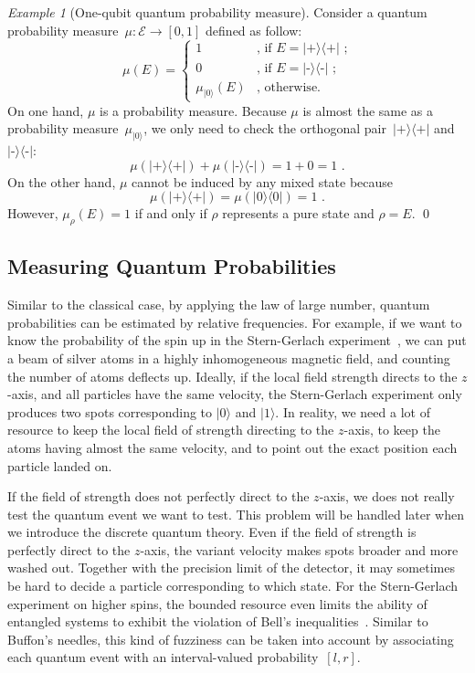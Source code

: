 \documentclass{article}
\theoremstyle{remark}
\newtheorem{example}{Example}
\newcommand{\events}{\ensuremath{\mathcal{E}}}
\newcommand{\ket}[1]{|#1\rangle}
\newcommand{\proj}[1]{|#1 \rangle\langle #1 |}
\newcommand{\ps}{\texttt{+}}
\newcommand{\ms}{\texttt{-}}
\begin{document}
\begin{example}[One-qubit quantum probability measure] Consider
a quantum probability measure~$\mu:\events\rightarrow[0,1]$ defined
as follow: 
\[
\mu(E)=\begin{cases}
1 & \textrm{, if }E=\proj{\ps}\textrm{ ;}\\
0 & \textrm{, if }E=\proj{\ms}\textrm{ ;}\\
\mu_{\ket{0}}(E) & \textrm{, otherwise.}
\end{cases}
\]
On one hand, $\mu$ is a probability measure. Because $\mu$ is almost
the same as a probability measure~$\mu_{\ket{0}}$, we only need
to check the orthogonal pair~$\proj{\ps}$ and $\proj{\ms}$: 
\[
\mu(\proj{\ps})+\mu(\proj{\ms})=1+0=1\textrm{ .}
\]
On the other hand, $\mu$ cannot be induced by any mixed state because
\[
\mu(\proj{\ps})=\mu(\proj{0})=1\textrm{ .}
\]
However, $\mu_{\rho}(E)=1$ if and only if $\rho$ represents a pure
state and $\rho=E$. \qed\end{example}

\subsection{Measuring Quantum Probabilities}

Similar to the classical case, by applying the law of large number,
quantum probabilities can be estimated by relative frequencies. For
example, if we want to know the probability of the spin up in the
Stern-Gerlach experiment~\cite{Stern1988,peres1995quantum,544199,Griffiths2003},
we can put a beam of silver atoms in a highly inhomogeneous magnetic
field, and counting the number of atoms deflects up. Ideally, if the
local field strength directs to the $z$-axis, and all particles have
the same velocity, the Stern-Gerlach experiment only produces two
spots corresponding to $\ket{0}$ and $\ket{1}$. In reality, we need
a lot of resource to keep the local field of strength directing to
the $z$-axis, to keep the atoms having almost the same velocity,
and to point out the exact position each particle landed on. 

If the field of strength does not perfectly direct to the $z$-axis,
we does not really test the quantum event we want to test. This problem
will be handled later when we introduce the discrete quantum theory.
Even if the field of strength is perfectly direct to the $z$-axis,
the variant velocity makes spots broader and more washed out. Together
with the precision limit of the detector, it may sometimes be hard
to decide a particle corresponding to which state. For the Stern-Gerlach
experiment on higher spins, the bounded resource even limits the ability
of entangled systems to exhibit the violation of Bell's inequalities~\cite{CostaHarriganRudolphEtAl2009}.
Similar to Buffon's needles, this kind of fuzziness can be taken into
account by associating each quantum event with an interval-valued
probability~$\left[l,r\right]$. 
\end{document}
